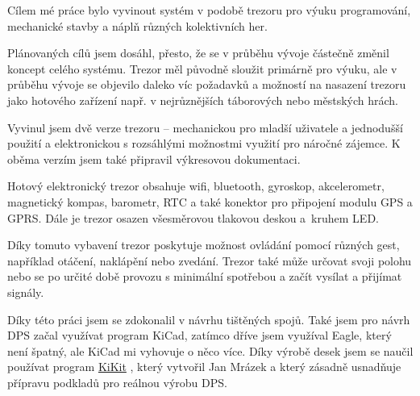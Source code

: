 Cílem mé práce bylo vyvinout systém v podobě trezoru pro výuku programování, mechanické stavby a náplň různých kolektivních her. 

Plánovaných cílů jsem dosáhl, přesto, že se v průběhu vývoje částečně změnil koncept celého systému. Trezor měl původně sloužit primárně pro výuku, ale v průběhu vývoje 
se objevilo daleko víc požadavků a možností na nasazení trezoru jako hotového zařízení např. v nejrůznějších táborových nebo městských hrách. 

Vyvinul jsem dvě verze trezoru -- mechanickou pro mladší uživatele 
a jednodušší použití a elektronickou s rozsáhlými možnostmi využití pro 
náročné zájemce. 
K oběma verzím jsem také připravil výkresovou dokumentaci. 

Hotový elektronický trezor obsahuje wifi, bluetooth, gyroskop, akcelerometr,
magnetický kompas, barometr, RTC a také konektor pro připojení modulu GPS a GPRS. 
Dále je trezor osazen všesměrovou tlakovou deskou a~kruhem LED.

Díky tomuto vybavení trezor poskytuje možnost 
ovládání pomocí různých gest, například otáčení, naklápění nebo zvedání. 
Trezor také může určovat svoji polohu nebo se po určité době 
provozu s minimální spotřebou  a začít vysílat a přijímat signály.



Díky této práci jsem se zdokonalil v návrhu tištěných spojů. Také jsem pro návrh DPS začal využívat program KiCad, zatímco dříve jsem využíval Eagle, který není špatný, ale KiCad 
mi vyhovuje o něco více. Díky výrobě desek jsem se naučil používat program \href{https://github.com/yaqwsx/KiKit}{KiKit} \parencite{KiKit}, 
který vytvořil Jan Mrázek a který zásadně usnadňuje přípravu podkladů pro reálnou výrobu DPS.


